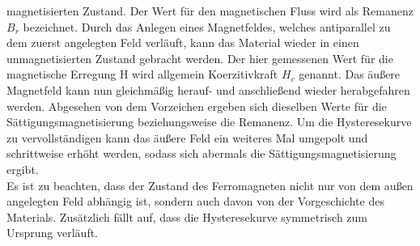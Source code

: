 magnetisierten Zustand. Der Wert für den magnetischen Fluss wird als Remanenz $B_r$ bezeichnet. Durch das Anlegen eines Magnetfeldes, welches antiparallel zu dem 
zuerst angelegten Feld verläuft, kann das Material wieder in einen unmagnetisierten Zustand gebracht werden. Der hier gemessenen Wert 
für die magnetische Erregung H wird allgemein Koerzitivkraft $H_c$ genannt. Das äußere Magnetfeld kann nun gleichmäßig herauf- und anschließend wieder herabgefahren werden.
Abgesehen von dem Vorzeichen ergeben sich dieselben Werte für die Sättigungsmagnetisierung beziehungsweise die Remanenz. Um die Hysteresekurve
zu vervollständigen kann das äußere Feld ein weiteres Mal umgepolt und schrittweise erhöht werden, sodass sich abermals die Sättigungsmagnetisierung
ergibt. 
\\
Es ist zu beachten, dass der Zustand des Ferromagneten nicht nur von dem außen angelegten Feld abhängig ist, sondern auch davon
von der Vorgeschichte des Materials. Zusätzlich fällt auf, dass die Hysteresekurve symmetrisch zum Ursprung verläuft.
